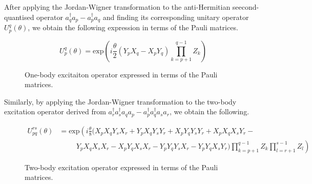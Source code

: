 After applying the Jordan-Wigner transformation to the anti-Hermitian seecond-quantised operator $a_q^\dagger a_p - a_p^\dagger a_q$ and finding its corresponding unitary operator $U^q_p(\theta)$, we obtain the following expression in terms of the Pauli matrices.


\begin{figure}[H]
    \centering
    \begin{equation*}
        U^q_p (\theta) =
        \text{exp} \left( i
        \frac{\theta}{2} (Y_p X_q - X_p Y_q) \prod_{k=p+1}^{q-1} Z_k \right)
    \end{equation*}
    \caption{One-body excitaiton operator expressed in terms of the Pauli matrices.}
    \label{one-body-excitation-operator}
\end{figure}

Similarly, by applying the Jordan-Wigner transformation to the two-body excitation operator derived from $a_r^\dagger a_s^\dagger a_q a_p - a_p^\dagger a_q^\dagger a_s a_r$, we obtain the following.


\begin{figure}[H]
    \centering
    \begin{align*}
        U^{rs}_{pq} (\theta) &= \text{exp} \left( i \frac{\theta}{8} (
        X_p X_q Y_s X_r +
        Y_p X_q Y_s Y_r +
        X_p Y_q Y_s Y_r +
        X_p X_q X_s Y_r - \right. \\
        &\left. \hspace{1cm} 
        Y_p X_q X_s X_r -
        X_p Y_q X_s X_r -
        Y_p Y_q Y_s X_r -
        Y_p Y_q X_s Y_r )
        \prod_{k=p+1}^{q-1} Z_k
        \prod_{l=r+1}^{s-1} Z_l
        \right)
    \end{align*}
    \caption{Two-body excitation operator expressed in terms of the Pauli matrices.}
\end{figure}

